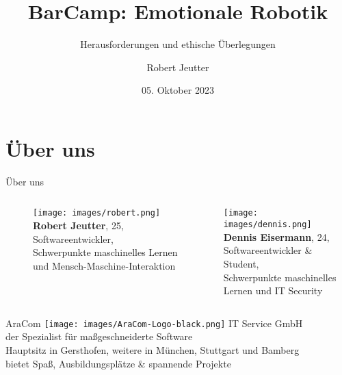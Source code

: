 \documentclass[aspectratio=169]{beamer}
\title{BarCamp: Emotionale Robotik}
\subtitle{Herausforderungen und ethische Überlegungen}
\author{Robert Jeutter}
\date{05. Oktober 2023}
\begin{document}
\maketitle

\section{Über uns}
\begin{frame}{Über uns}
  \begin{columns}
    \begin{column}{0.45\textwidth}
      \begin{figure}[h]
        \centering
        \texttt{[image: images/robert.png]}\\
        \textbf{Robert Jeutter}, 25,\\
        Softwareentwickler,\\
        \scriptsize{Schwerpunkte maschinelles Lernen und Mensch-Maschine-Interaktion}
      \end{figure}
    \end{column}
    \begin{column}{0.45\textwidth}
      \texttt{[image: images/dennis.png]}\\
      \textbf{Dennis Eisermann}, 24,\\
      Softwareentwickler \& Student,\\
      \scriptsize{Schwerpunkte maschinelles Lernen und IT Security}
    \end{column}
  \end{columns}
\end{frame}
\begin{frame}{AraCom}
  \texttt{[image: images/AraCom-Logo-black.png]}
  IT Service GmbH\\
  der Spezialist für maßgeschneiderte Software\\
  Hauptsitz in Gersthofen, weitere in München, Stuttgart und Bamberg\\
  bietet Spaß, Ausbildungsplätze \& spannende Projekte
\end{frame}
\end{document}
